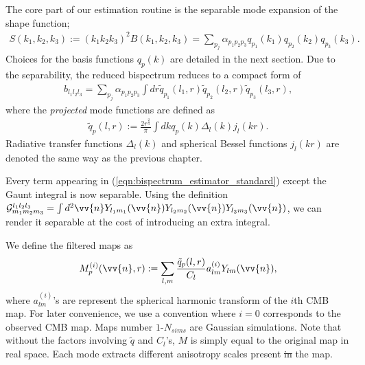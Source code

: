 \documentclass[a4paper,12pt,times,custombib,print,index]{Classes/PhDThesisPSnPDF} %
\providecommand{\DIFadd}[1]{{\protect\color{blue}\uwave{#1}}} %
\providecommand{\DIFdel}[1]{{\protect\color{red}\sout{#1}}}                      %
\providecommand{\DIFaddbegin}{} %
\providecommand{\DIFaddend}{} %
\providecommand{\DIFdelbegin}{} %
\providecommand{\DIFdelend}{} %
\newcommand{\DIFscaledelfig}{0.5}
\newlength{\DIFdelgraphicswidth} %
\newlength{\DIFdelgraphicsheight} %
\newcommand{\DIFaddincludegraphics}[2][]{{\color{blue}\fbox{\DIFOincludegraphics[#1]{#2}}}} %
\newcommand{\DIFdelincludegraphics}[2][]{%
\sbox{\DIFdelgraphicsbox}{\DIFOincludegraphics[#1]{#2}}%
\settoboxwidth{\DIFdelgraphicswidth}{\DIFdelgraphicsbox} %
\settoboxtotalheight{\DIFdelgraphicsheight}{\DIFdelgraphicsbox} %
\scalebox{\DIFscaledelfig}{%
\parbox[b]{\DIFdelgraphicswidth}{\usebox{\DIFdelgraphicsbox}\\[-\baselineskip] \rule{\DIFdelgraphicswidth}{0em}}\llap{\resizebox{\DIFdelgraphicswidth}{\DIFdelgraphicsheight}{%
\setlength{\unitlength}{\DIFdelgraphicswidth}%
\begin{picture}(1,1)%
\thicklines\linethickness{2pt} %
{\color[rgb]{1,0,0}\put(0,0){\framebox(1,1){}}}%
{\color[rgb]{1,0,0}\put(0,0){\line( 1,1){1}}}%
{\color[rgb]{1,0,0}\put(0,1){\line(1,-1){1}}}%
\end{picture}%
}\hspace*{3pt}}} %
} %
\DeclareRobustCommand{\DIFaddbegin}{\DIFOaddbegin \let\includegraphics\DIFaddincludegraphics} %
\DeclareRobustCommand{\DIFaddend}{\DIFOaddend \let\includegraphics\DIFOincludegraphics} %
\DeclareRobustCommand{\DIFdelbegin}{\DIFOdelbegin \let\includegraphics\DIFdelincludegraphics} %
\DeclareRobustCommand{\DIFdelend}{\DIFOaddend \let\includegraphics\DIFOincludegraphics} %
\begin{document}
The core part of our estimation routine is the separable mode expansion of the shape function;
\begin{align}
	S(k_1, k_2, k_3) := (k_1 k_2 k_3)^2 B(k_1, k_2, k_3) = \sum_{p_j} \alpha_{p_1 p_2 p_3} q_{p_1}(k_1) q_{p_2}(k_2) q_{p_3}(k_3).
\end{align}
Choices for the basis functions $q_p(k)$ are detailed in the next section. Due to the separability, the reduced bispectrum reduces to a compact form of
\begin{align}
	b_{l_1 l_2 l_3} = \sum_{p_j} \alpha_{p_1 p_2 p_3} \int dr \tilde{q}_{p_1}(l_1,r) \tilde{q}_{p_2}(l_2,r) \tilde{q}_{p_3}(l_3,r),
\end{align}
where the \textit{projected} mode functions are defined as
\begin{align}
	\tilde{q}_{p}(l,r) := \frac{2r^\frac{2}{3}}{\pi} \int dk q_p(k) \Delta_l(k) j_l (kr).
\end{align}
Radiative transfer functions $\Delta_l(k)$ and spherical Bessel functions $j_l(kr)$ are denoted the same way as \DIFaddbegin \DIFadd{in }\DIFaddend the previous chapter.

Every term appearing in (\ref{eqn:bispectrum_estimator_standard}) except the Gaunt integral is now separable. Using the definition $\mathcal{G}^{l_1 l_2 l_3}_{m_1 m_2 m_3} = \int d^2 \vv{n} Y_{l_1 m_1}(\vv{n}) Y_{l_2 m_2}(\vv{n}) Y_{l_3 m_3}(\vv{n})$, we can render it separable at the cost of introducing an extra integral.

We define the filtered maps as
\begin{align}
	M^{(i)}_p (\vv{n}, r) := \sum_{l,m} \frac{\tilde{q}_p (l,r)}{C_l} a^{(i)}_{lm} Y_{lm} (\vv{n}), \label{def:filtered_maps}
\end{align}
where $a^{(i)}_{lm}$'s are represent the spherical harmonic transform of the $i$th CMB map. For later convenience, we use a convention where $i=0$ corresponds to the observed CMB map. Maps number $1$-\DIFdelbegin \DIFdel{$N_{sims}$ }\DIFdelend \DIFaddbegin \DIFadd{$N_\text{sims}$ }\DIFaddend are Gaussian simulations. Note that without the factors involving $\tilde{q}$ and $C_l$'s, $M$ is simply equal to the original map in real space. Each mode extracts different anisotropy scales present \DIFdelbegin \DIFdel{in }\DIFdelend \DIFaddbegin \DIFadd{on }\DIFaddend the map.
\end{document}
